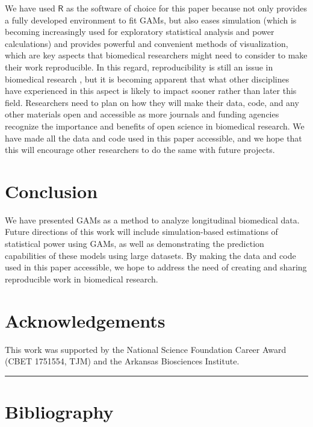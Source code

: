 \documentclass[Royal,times,sagev]{sagej}
\begin{document}
We have used \(\textsf{R}\) as the software of choice for this paper
because not only provides a fully developed environment to fit GAMs, but
also eases simulation (which is becoming increasingly used for
exploratory statistical analysis and power calculations) and provides
powerful and convenient methods of visualization, which are key aspects
that biomedical researchers might need to consider to make their work
reproducible. In this regard, reproducibility is still an issue in
biomedical research \citep{begley2015, weissgerber2018}, but it is
becoming apparent that what other disciplines have experienced in this
aspect is likely to impact sooner rather than later this field.
Researchers need to plan on how they will make their data, code, and any
other materials open and accessible as more journals and funding
agencies recognize the importance and benefits of open science in
biomedical research. We have made all the data and code used in this
paper accessible, and we hope that this will encourage other researchers
to do the same with future projects.

\hypertarget{conclusion}{%
\section{Conclusion}\label{conclusion}}

We have presented GAMs as a method to analyze longitudinal biomedical
data. Future directions of this work will include simulation-based
estimations of statistical power using GAMs, as well as demonstrating
the prediction capabilities of these models using large datasets. By
making the data and code used in this paper accessible, we hope to
address the need of creating and sharing reproducible work in biomedical
research.

\hypertarget{acknowledgements}{%
\section{Acknowledgements}\label{acknowledgements}}

This work was supported by the National Science Foundation Career Award
(CBET 1751554, TJM) and the Arkansas Biosciences Institute.

\begin{center}\rule{0.5\linewidth}{0.5pt}\end{center}

\hypertarget{bibliography}{%
\section{Bibliography}\label{bibliography}}
\end{document}
